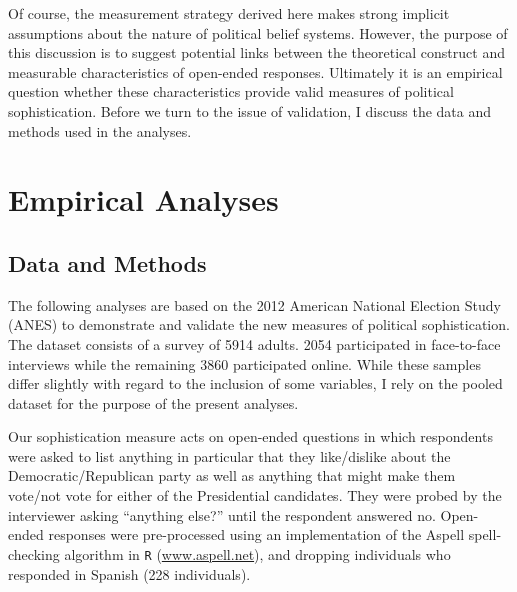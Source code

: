 \documentclass[12pt]{article}
\begin{document}
Of course, the measurement strategy derived here makes strong implicit assumptions about the nature of political belief systems. However, the purpose of this discussion is to suggest potential links between the theoretical construct and measurable characteristics of open-ended responses. Ultimately it is an empirical question whether these characteristics provide valid measures of political sophistication. Before we turn to the issue of validation, I discuss the data and methods used in the analyses.


\section{Empirical Analyses}

\subsection{Data and Methods}

The following analyses are based on the 2012 American National Election Study (ANES) to demonstrate and validate the new measures of political sophistication. The dataset consists of a survey of 5914 adults. 2054 participated in face-to-face interviews while the remaining 3860 participated online. While these samples differ slightly with regard to the inclusion of some variables, I rely on the pooled dataset for the purpose of the present analyses.

Our sophistication measure acts on open-ended questions in which respondents were asked to list anything in particular that they like/dislike about the Democratic/Republican party as well as anything that might make them vote/not vote for either of the Presidential candidates. They were probed by the interviewer asking ``anything else?'' until the respondent answered no. Open-ended responses were pre-processed using an implementation of the Aspell spell-checking algorithm in \texttt{R} (\url{www.aspell.net}), and dropping individuals who responded in Spanish (228 individuals). 
\end{document}
